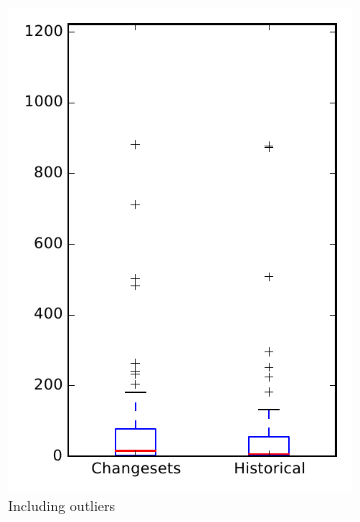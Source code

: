 
\begin{figure}
    \centering
    \begin{subfigure}{.4\textwidth}
        \centering
        \includegraphics[height=0.4\textheight]{figures/flt/rq2_mahout}
        \caption{Including outliers}\label{fig:flt:rq2:mahout_outlier}
    \end{subfigure}%
    \begin{subfigure}{.4\textwidth}
        \centering

\end{subfigure}
\end{figure}
